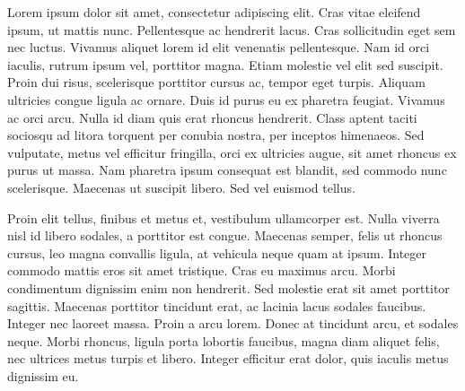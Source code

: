 Lorem ipsum dolor sit amet, consectetur adipiscing elit. Cras vitae eleifend ipsum, ut mattis nunc. Pellentesque ac hendrerit lacus. Cras sollicitudin eget sem nec luctus. Vivamus aliquet lorem id elit venenatis pellentesque. Nam id orci iaculis, rutrum ipsum vel, porttitor magna. Etiam molestie vel elit sed suscipit. Proin dui risus, scelerisque porttitor cursus ac, tempor eget turpis. Aliquam ultricies congue ligula ac ornare. Duis id purus eu ex pharetra feugiat. Vivamus ac orci arcu. Nulla id diam quis erat rhoncus hendrerit. Class aptent taciti sociosqu ad litora torquent per conubia nostra, per inceptos himenaeos. Sed vulputate, metus vel efficitur fringilla, orci ex ultricies augue, sit amet rhoncus ex purus ut massa. Nam pharetra ipsum consequat est blandit, sed commodo nunc scelerisque. Maecenas ut suscipit libero. Sed vel euismod tellus.

Proin elit tellus, finibus et metus et, vestibulum ullamcorper est. Nulla viverra nisl id libero sodales, a porttitor est congue. Maecenas semper, felis ut rhoncus cursus, leo magna convallis ligula, at vehicula neque quam at ipsum. Integer commodo mattis eros sit amet tristique. Cras eu maximus arcu. Morbi condimentum dignissim enim non hendrerit. Sed molestie erat sit amet porttitor sagittis. Maecenas porttitor tincidunt erat, ac lacinia lacus sodales faucibus. Integer nec laoreet massa. Proin a arcu lorem. Donec at tincidunt arcu, et sodales neque. Morbi rhoncus, ligula porta lobortis faucibus, magna diam aliquet felis, nec ultrices metus turpis et libero. Integer efficitur erat dolor, quis iaculis metus dignissim eu.